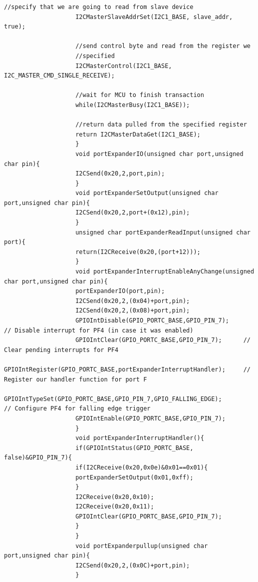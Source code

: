 \documentclass[a4paper,12pt,oneside]{article}
\begin{document}
\begin{lstlisting}[style=CStyle]
					//specify that we are going to read from slave device
					I2CMasterSlaveAddrSet(I2C1_BASE, slave_addr, true);
					
					//send control byte and read from the register we
					//specified
					I2CMasterControl(I2C1_BASE, I2C_MASTER_CMD_SINGLE_RECEIVE);
					
					//wait for MCU to finish transaction
					while(I2CMasterBusy(I2C1_BASE));
					
					//return data pulled from the specified register
					return I2CMasterDataGet(I2C1_BASE);
					}
					void portExpanderIO(unsigned char port,unsigned char pin){
					I2CSend(0x20,2,port,pin);
					}
					void portExpanderSetOutput(unsigned char port,unsigned char pin){
					I2CSend(0x20,2,port+(0x12),pin);
					}
					unsigned char portExpanderReadInput(unsigned char port){
					return(I2CReceive(0x20,(port+12)));
					}
					void portExpanderInterruptEnableAnyChange(unsigned char port,unsigned char pin){
					portExpanderIO(port,pin);
					I2CSend(0x20,2,(0x04)+port,pin);
					I2CSend(0x20,2,(0x08)+port,pin);
					GPIOIntDisable(GPIO_PORTC_BASE,GPIO_PIN_7);        // Disable interrupt for PF4 (in case it was enabled)
					GPIOIntClear(GPIO_PORTC_BASE,GPIO_PIN_7);      // Clear pending interrupts for PF4
					GPIOIntRegister(GPIO_PORTC_BASE,portExpanderInterruptHandler);     // Register our handler function for port F
					GPIOIntTypeSet(GPIO_PORTC_BASE,GPIO_PIN_7,GPIO_FALLING_EDGE);             // Configure PF4 for falling edge trigger
					GPIOIntEnable(GPIO_PORTC_BASE,GPIO_PIN_7);
					}
					void portExpanderInterruptHandler(){
					if(GPIOIntStatus(GPIO_PORTC_BASE, false)&GPIO_PIN_7){
					if(I2CReceive(0x20,0x0e)&0x01==0x01){
					portExpanderSetOutput(0x01,0xff);
					}
					I2CReceive(0x20,0x10);
					I2CReceive(0x20,0x11);
					GPIOIntClear(GPIO_PORTC_BASE,GPIO_PIN_7);
					}
					}
					void portExpanderpullup(unsigned char port,unsigned char pin){
					I2CSend(0x20,2,(0x0C)+port,pin);
					}
				\end{lstlisting}	
\end{document}
